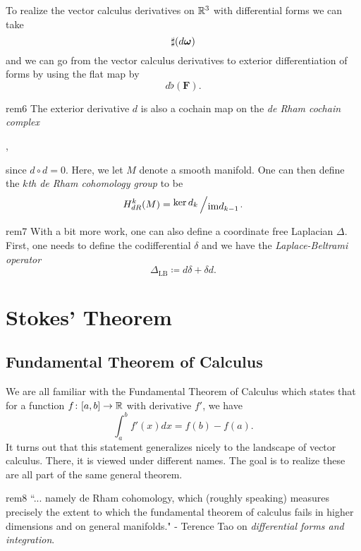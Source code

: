 \noindent To realize the vector calculus derivatives on $\mathbb{R}^3$ with differential forms we can take
\[
\sharp(d\boldsymbol{\omega})
\]
and we can go from the vector calculus derivatives to exterior differentiation of forms by using the flat map by
\[
d \flat(\mathbf{F}).
\]



\begin{remark}{}{rem6}
The exterior derivative $d$ is also a cochain map on the \emph{de Rham cochain complex} 
\begin{center}
,
\end{center}
since $d\circ d = 0$. Here, we let $M$ denote a smooth manifold. One can then define the \emph{$k$th de Rham cohomology group} to be
\[
H^k_{dR}(M) = \bigslant{\ker d_k}{\textrm{im} d_{k-1}}. 
\]
\end{remark}

\begin{remark}{}{rem7}
With a bit more work, one can also define a coordinate free Laplacian $\Delta$.  First, one needs to define the codifferential $\delta$ and we have the \emph{Laplace-Beltrami operator}
\[
\Delta_{\textrm{LB}}\coloneqq d\delta + \delta d.
\]
\end{remark}

\section{Stokes' Theorem}

\subsection{Fundamental Theorem of Calculus}

We are all familiar with the Fundamental Theorem of Calculus which states that for a function $f\colon [a,b] \to \mathbb{R}$ with derivative $f'$, we have
\[
\int_a^b f'(x)dx = f(b)-f(a).
\]
It turns out that this statement generalizes nicely to the landscape of vector calculus.  There, it is viewed under different names.  The goal is to realize these are all part of the same general theorem.

\begin{remark}{}{rem8}
``... namely de Rham cohomology, which (roughly speaking) measures precisely the extent to which the fundamental theorem of calculus fails in higher dimensions and on general manifolds." - Terence Tao on \emph{differential forms and integration}.
\end{remark}

